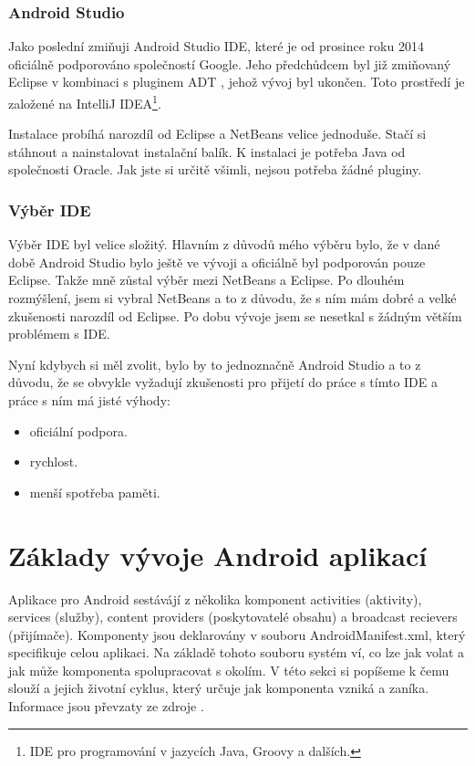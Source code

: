 \documentclass[12pt]{article}
\begin{document}
\subsubsection{Android Studio}
Jako poslední zmiňuji Android Studio IDE, které je od prosince roku 2014 oficiálně podporováno společností Google. Jeho předchůdcem byl již zmiňovaný Eclipse v kombinaci s pluginem ADT	, jehož vývoj byl ukončen. Toto prostředí je založené na IntelliJ IDEA\footnote[7]{IDE pro programování v jazycích Java, Groovy a dalších.}.

Instalace probíhá narozdíl od Eclipse a NetBeans velice jednoduše. Stačí si stáhnout a nainstalovat instalační balík. K instalaci je potřeba Java od společnosti Oracle. Jak jste si určitě všimli, nejsou potřeba žádné pluginy. \cite{studio}

\subsubsection{Výběr IDE}
Výběr IDE byl velice složitý. Hlavním z důvodů mého výběru bylo, že v dané době Android Studio bylo ještě ve vývoji a oficiálně byl podporován pouze Eclipse. Takže mně zůstal výběr mezi NetBeans a Eclipse. Po dlouhém rozmýšlení, jsem si vybral NetBeans a to z důvodu, že s ním mám dobré a velké zkušenosti narozdíl od Eclipse. Po dobu vývoje jsem se nesetkal s žádným větším problémem s IDE.

Nyní kdybych si měl zvolit, bylo by to jednoznačně Android Studio a to z důvodu, že se obvykle vyžadují zkušenosti pro přijetí do práce s tímto IDE a práce s ním má jisté výhody:
\begin{itemize}
\item oficiální podpora.
\item rychlost.
\item menší spotřeba paměti.
\end{itemize}
\newpage
\section{Základy vývoje Android aplikací}
Aplikace pro Android sestávájí z několika komponent activities (aktivity), services (služby), content providers (poskytovatelé obsahu) a broadcast recievers (přijímače). Komponenty jsou deklarovány v souboru AndroidManifest.xml, který specifikuje celou aplikaci. Na základě tohoto souboru systém ví, co lze jak volat a jak může komponenta spolupracovat s okolím. V této sekci si popíšeme k čemu slouží a jejich životní cyklus, který určuje jak komponenta vzniká a zaníka. Informace jsou převzaty ze zdroje \cite{slozeni}.
\end{document}
